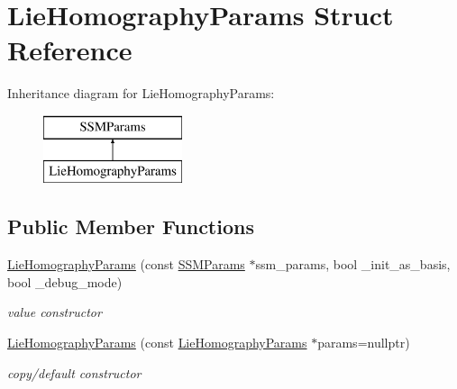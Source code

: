 \hypertarget{structLieHomographyParams}{\section{Lie\-Homography\-Params Struct Reference}
\label{structLieHomographyParams}
}
Inheritance diagram for Lie\-Homography\-Params\-:\begin{figure}[H]
\begin{center}
\leavevmode
\includegraphics[height=2.000000cm]{structLieHomographyParams}
\end{center}
\end{figure}
\subsection*{Public Member Functions}
\begin{DoxyCompactItemize}
\item 
\hypertarget{structLieHomographyParams_a18cb289a3b06d5a14533c0afb1c78f45}{\hyperlink{structLieHomographyParams_a18cb289a3b06d5a14533c0afb1c78f45}{Lie\-Homography\-Params} (const \hyperlink{structSSMParams}{S\-S\-M\-Params} $\ast$ssm\-\_\-params, bool \-\_\-init\-\_\-as\-\_\-basis, bool \-\_\-debug\-\_\-mode)}\label{structLieHomographyParams_a18cb289a3b06d5a14533c0afb1c78f45}

\begin{DoxyCompactList}\small\item\em value constructor \end{DoxyCompactList}\item 
\hypertarget{structLieHomographyParams_abeb5b3804b293aa46dbb1535b8809142}{\hyperlink{structLieHomographyParams_abeb5b3804b293aa46dbb1535b8809142}{Lie\-Homography\-Params} (const \hyperlink{structLieHomographyParams}{Lie\-Homography\-Params} $\ast$params=nullptr)}\label{structLieHomographyParams_abeb5b3804b293aa46dbb1535b8809142}

\begin{DoxyCompactList}\small\item\em copy/default constructor \end{DoxyCompactList}\end{DoxyCompactItemize}
